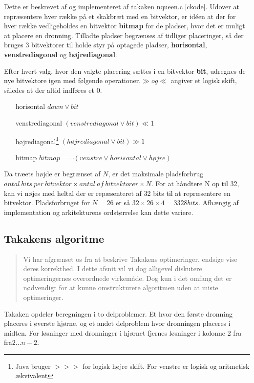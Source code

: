 \documentclass[draft,a4paper,10pt]{article}
\begin{document}

Dette er beskrevet af \cite{Zongyan02} og implementeret af takaken nqueen.c \ref{ckode}. Udover at repræsentere hver række på et skakbræt med en bitvektor, er idéen at der for hver række vedligeholdes en bitvektor \textbf{bitmap} for de pladser, hvor det er muligt at placere en dronning.  Tilladte pladser begrænses af tidliger placeringer, så der bruges 3 bitvektorer til holde styr på optagede pladser, \textbf{horisontal}, \textbf{venstrediagonal}  og \textbf{højrediagonal}.

Efter hvert valg, hvor den valgte placering sættes i en bitvektor \textbf{bit}, udregnes de nye bitvektore igen med følgende operationer.$\gg og \ll$ angiver et logisk skift, således at der altid indføres et $0$.
\begin{itemize}
	\item[horisontal] $down \lor bit$ 
	\item[venstrediagonal] $(venstrediagonal \lor bit) \ll 1$
	\item[højrediagonal\footnote{Java bruger $>>>$ for logisk højre skift. For venstre er logisk og aritmetisk ækvivalent}] $(højrediagonal \lor bit) \gg 1$
	\item[bitmap]	$bitmap = \lnot(venstre \lor horisontal \lor højre)$	
\end{itemize}

Da træets højde er begrænset af $N$, er det maksimale pladsforbrug $antal\ bits\ per\ bitvektor \times antal\ af\ bitvektorer \times N$. For at håndtere N op til 32, kan vi nøjes med heltal der er repæsenteret af 32 bits til at repræsentere en bitvektor. Pladsforbruget for $N=26$ er så $32\times 26 \times 4 = 3328 bits$. Afhængig af implementation og arkitekturens ordstørrelse kan dette variere.



\subsection{Takakens algoritme}\label{takalgo}
\begin{verse}
	Vi har afgrænset os fra at beskrive Takakens optimeringer, endsige vise deres korrekthed. I dette afsnit vil vi dog alligevel diskutere optimeringernes overordnede virkemåde. Dog kun i det omfang det er nødvendigt for at kunne omstrukturere algoritmen uden at miste optimeringer.   
\end{verse}

Takaken opdeler beregningen i to delproblemer. Et hvor den første dronning placeres i øverste hjørne, og et andet delproblem hvor dronningen placeres i midten. For løsninger med dronninger i hjørnet fjernes løsninger i kolonne 2 fra fra$2 \ldots n-2$. 
\end{document}
